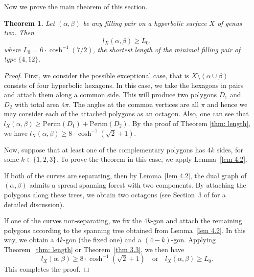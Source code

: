 \documentclass[11pt,reqno]{amsart}
\theoremstyle{plain}
\newtheorem{theorem}{Theorem}[section]
\theoremstyle{definition}
\theoremstyle{remark}
\numberwithin{equation}{section}
\numberwithin{figure}{section}
\begin{document}
Now we prove the main theorem of this section.
\begin{theorem}
    Let $(\alpha,\beta)$ be any filling pair on a hyperbolic surface $X$ of genus two. Then 
    $$l_X(\alpha,\beta)\geq L_0,$$
    where $L_0= 6 \cdot \cosh^{-1}(7/2)$, the shortest length of the minimal filling pair of type $\{ 4,12 \}$.
\end{theorem}
\begin{proof}
    First, we consider the possible exceptional case, that is $X\setminus (\alpha \cup \beta)$ consists of four hyperbolic hexagons. In this case, we take the hexagons in pairs and attach them along a common side. This will produce two polygons $D_1$ and $D_2$ with total area $4\pi$. The angles at the common vertices are all $\pi$ and hence we may consider each of the attached polygons as an octagon. Also, one can see that $l_X(\alpha,\beta)\geq \mathrm{Perim}(D_1)+ \mathrm{Perim}(D_2)$. By the proof of Theorem \ref{thm: length}, we have $l_X(\alpha,\beta)\geq 8\cdot\cosh^{-1}\left(\sqrt{2}+1\right)$.

    Now, suppose that at least one of the complementary polygons has $4k$ sides, for some $k \in \{1,2,3\}$. To prove the theorem in this case, we apply Lemma~\ref{lem 4.2}.

    If both of the curves are separating, then by Lemma~\ref{lem 4.2}, the dual graph of $(\alpha,\beta)$ admits a spread spanning forest with two components. By attaching the polygons along these trees, we obtain two octagons (see Section~3 of \cite{Gaster} for a detailed discussion).

    If one of the curves non-separating, we fix the $4k$-gon and attach the remaining polygons according to the spanning tree obtained from Lemma~\ref{lem 4.2}. In this way, we obtain a $4k$-gon (the fixed one) and a $(4-k)$-gon. Applying Theorem~\ref{thm: length} or Theorem~\ref{thm 3.3}, we then have
    $$
    l_X(\alpha,\beta) \geq 8\cdot\cosh^{-1} \! \left(\sqrt{2}+1\right)
    \quad \text{or} \quad 
    l_X(\alpha,\beta) \geq L_0.
    $$
    This completes the proof.
\end{proof}





\end{document}

